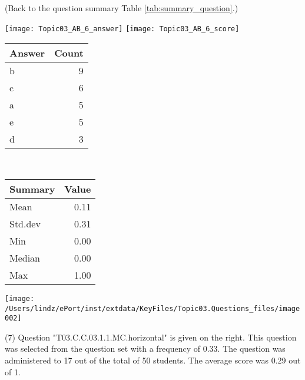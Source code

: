 \documentclass[12pt,english,nohyper]{tufte-handout}\usepackage[]{graphicx}\usepackage[]{color}
\begin{document}
 (Back to the question summary Table \ref{tab:summary_question}.)

\begin{center} \texttt{[image: Topic03\_AB\_6\_answer]} \texttt{[image: Topic03\_AB\_6\_score]} \end{center} 

\begin{center}%
\begin{tabular}{lr}
  \hline
Answer & Count \\ 
  \hline
b &   9 \\ 
  c &   6 \\ 
  a &   5 \\ 
  e &   5 \\ 
  d &   3 \\ 
   \hline
\end{tabular}
~~~~~~~~%
\begin{tabular}{lr}
  \hline
Summary & Value \\ 
  \hline
Mean & 0.11 \\ 
  Std.dev & 0.31 \\ 
  Min & 0.00 \\ 
  Median & 0.00 \\ 
  Max & 1.00 \\ 
   \hline
\end{tabular}
\end{center}\newpage{}



\vspace{4cm}\begin{marginfigure}\texttt{[image: /Users/lindz/ePort/inst/extdata/KeyFiles/Topic03.Questions\_files/image002]}\end{marginfigure}\vspace{-4cm} (7) Question "T03.C.C.03.1.1.MC.horizontal" is given on the right. This question was selected from the question set with a frequency of 0.33. The question was administered to 17 out of the total of 50 students. The average score was 0.29 out of 1.
\end{document}
